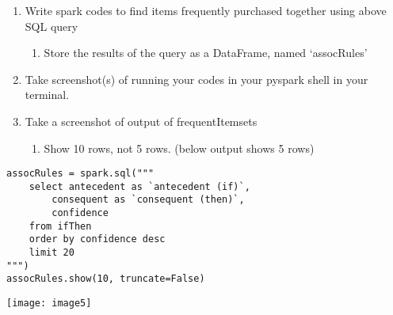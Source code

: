 \documentclass[]{article}
\begin{document}
\begin{enumerate}[before=\itshape,label=\arabic*.]
	\item Write spark codes to find items frequently purchased together using above SQL query
	\begin{enumerate}[before=\itshape,label=\alph*.]
		\item Store the results of the query as a DataFrame, named ‘assocRules’
	\end{enumerate}
	\item Take screenshot(s) of running your codes in your pyspark shell in your terminal.
	\item Take a screenshot of output of frequentItemsets
	\begin{enumerate}[before=\itshape,label=\alph*.]
		\item Show 10 rows, not 5 rows. (below output shows 5 rows)
	\end{enumerate}
\end{enumerate} 

\begin{verbatim}
assocRules = spark.sql("""
	select antecedent as `antecedent (if)`, 
		consequent as `consequent (then)`,
		confidence 
	from ifThen 
	order by confidence desc 
	limit 20
""")
assocRules.show(10, truncate=False)
\end{verbatim}
\texttt{[image: image5]}
\end{document}
